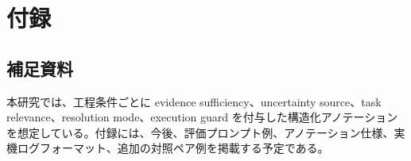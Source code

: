 \chapter{付録}

\section{補足資料}

本研究では、工程条件ごとに evidence sufficiency、uncertainty source、task relevance、resolution mode、execution guard を付与した構造化アノテーションを想定している。付録には、今後、評価プロンプト例、アノテーション仕様、実機ログフォーマット、追加の対照ペア例を掲載する予定である。
